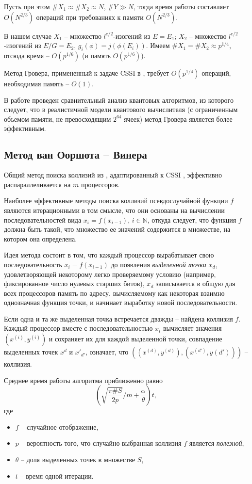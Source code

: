 \documentclass[a4paper,12pt]{article}
\newcommand{\NN}{\mathbb{N}}
\theoremstyle{definition}
\begin{document}
Пусть при этом $\#X_1\approx \#X_2 \approx N$, $\#Y\gg N$, тогда время работы составляет $O(N^{2/3})$ операций при требованиях к памяти $O(N^{2/3})$.

В нашем случае $X_1 $ -- множество $l^{e/2}$-изогений  из $E=E_1$; $X_2$ -- множество $l^{e/2}$-изогений  из $E/G=E_2$, $g_i(\phi)=j(\phi(E_i))$.
Имеем $\#X_1=\#X_2\approx p^{1/4}$, отсюда  время -- $O(p^{1/6})$ (и память $O(p^{1/6})$).

Метод Гровера, примененный к задаче CSSI в \cite{FFF}, требует $O(p^{1/4})$ операций,  необходимая память -- $O(1)$.

В работе \cite{FFF} проведен сравнительный анализ квантовых  алгоритмов, из которого следует, что в реалистичной модели квантового вычислителя (с ограниченным объемом памяти, не превосходящим
$2^{64}$ ячеек) метод Гровера является более эффективным.

 \subsection*{Метод ван Ооршота -- Винера}
 
Общий метод поиска коллизий из \cite{vOW}, адаптированный к CSSI \cite{Adj,Costello}, эффективно распараллеливается на $m$ процессоров.

Наиболее эффективные методы поиска коллизий псевдослучайной функции $f$ являются итерационными в том смысле, что они основаны на вычислении 
последовательностей вида $x_i = f(x_{i-1})$, $i \in \NN$, откуда следует, что функция $f$ должна быть такой, что множество ее значений содержится в множестве, 
на котором она определена.
 
Идея метода состоит в том, что
каждый процессор вырабатывает свою последовательность $x_i=f(x_{i-1})$ до появления \emph{выделенной точки} $x_d$, удовлетворяющей некоторому легко проверяемому условию (например, фиксированное число нулевых старших битов), $x_d$ записывается в общую для всех процессоров память по адресу, вычисляемому как некоторая взаимно однозначная функция точки, и начинает выработку новой последовательности.


Если одна и та же выделенная точка встречается дважды -- найдена коллизия $f$. Каждый процессор вместе с последовательностью $x_i$ вычисляет значения $(x^{(i)},y^{(i)})$ и сохраняет их для каждой выделенной точки, совпадение выделенных точек $x^d$ и $x'_{d'}$, означает, что $((x^{(d)}, y^{(d)}), (x^{(d')}, y{(d')}))$ -- коллизия.

Среднее время работы алгоритма приближенно равно
$$
\left(\sqrt{\frac{\pi\#S}{2p}}/m+\frac{\alpha}{\theta}\right)t,
$$
где
\begin{itemize}
\item $f$ -- случайное отображение,
\item $p$ -- вероятность того, что случайно выбранная коллизия $f$ является \emph{полезной},
\item $\theta$ -- доля выделенных точек в множестве $S$,
\item $t$ -- время одной итерации.
\end{itemize}
\end{document}
